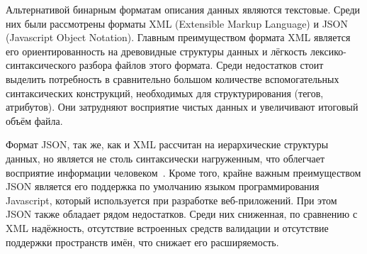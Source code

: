 Альтернативой бинарным форматам описания данных являются текстовые. Среди них были рассмотрены форматы XML (Extensible Markup Language) и JSON (Javascript Object Notation). Главным преимуществом формата XML является его ориентированность на древовидные структуры данных и лёгкость лексико-синтаксического разбора файлов этого формата. Среди недостатков стоит выделить потребность в сравнительно большом количестве вспомогательных синтаксических конструкций, необходимых для структурирования (тегов, атрибутов). Они затрудняют восприятие чистых данных и увеличивают итоговый объём файла. 

Формат JSON, так же, как и XML рассчитан на иерархические структуры данных, но является не столь синтаксически нагруженным, что облегчает восприятие информации человеком~\cite{JSONvsXML}. Кроме того, крайне важным преимуществом JSON является его поддержка по умолчанию языком программирования Javascript, который используется при разработке веб-приложений. При этом JSON также обладает рядом недостатков. Среди них сниженная, по сравнению с XML надёжность, отсутствие встроенных средств валидации и отсутствие поддержки пространств имён, что снижает его расширяемость.